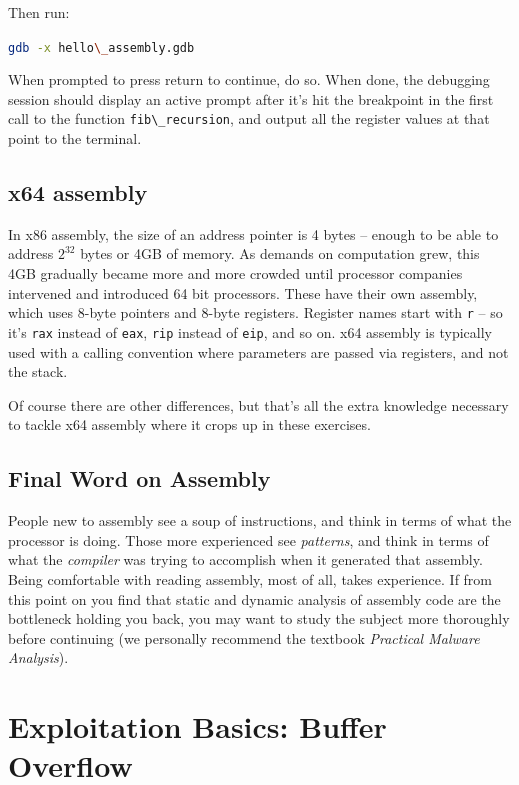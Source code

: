 \documentclass{article}
\newcommand{\xcode}[2]{\colorbox{ubuntuback}{\lstinline[language=#1]|#2|}}
\newcommand{\asm}[1]{\xcode{{[x86masm]assembler}}{#1}}
\newcommand{\code}[1]{\colorbox{ubuntuback}{\texttt{#1}}}
\begin{document}
Then run:

\xcode{bash}{gdb -x hello\_assembly.gdb}

When prompted to press return to continue, do so. When done, the debugging session should display an active prompt after it's hit the breakpoint in the first call to the function \xcode{C}{fib\_recursion}, and output all the register values at that point to the terminal.

\subsection{x64 assembly}

In x86 assembly, the size of an address pointer is 4 bytes -- enough to be able to address $2^{32}$ bytes or 4GB of memory. As demands on computation grew, this 4GB gradually became more and more crowded until processor companies intervened and introduced 64 bit processors. These have their own assembly, which uses 8-byte pointers and 8-byte registers. Register names start with \code{r} -- so it's \asm{rax} instead of \asm{eax}, \asm{rip} instead of \asm{eip}, and so on. x64 assembly is typically used with a calling convention where parameters are passed via registers, and not the stack.

Of course there are other differences, but that's all the extra knowledge necessary to tackle x64 assembly where it crops up in these exercises. 

\subsection{Final Word on Assembly}

People new to assembly see a soup of instructions, and think in terms of what the processor is doing. Those more experienced see \textit{patterns}, and think in terms of what the \textit{compiler} was trying to accomplish when it generated that assembly. Being comfortable with reading assembly, most of all, takes experience. If from this point on you find that static and dynamic analysis of assembly code are the bottleneck holding you back, you may want to study the subject more thoroughly before continuing (we personally recommend the textbook \textit{Practical Malware Analysis}). 

\section{Exploitation Basics: Buffer Overflow}
\end{document}
